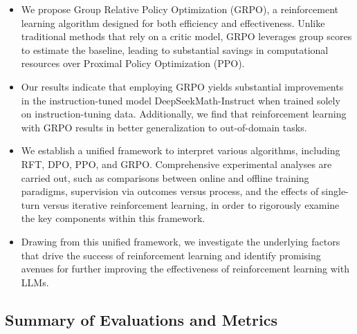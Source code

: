 \begin{itemize}[topsep=0pt]
    \item We propose Group Relative Policy Optimization (GRPO), a reinforcement learning algorithm designed for both efficiency and effectiveness. Unlike traditional methods that rely on a critic model, GRPO leverages group scores to estimate the baseline, leading to substantial savings in computational resources over Proximal Policy Optimization (PPO).
    \item Our results indicate that employing GRPO yields substantial improvements in the instruction-tuned model DeepSeekMath-Instruct when trained solely on instruction-tuning data. Additionally, we find that reinforcement learning with GRPO results in better generalization to out-of-domain tasks.
    \item We establish a unified framework to interpret various algorithms, including RFT, DPO, PPO, and GRPO. Comprehensive experimental analyses are carried out, such as comparisons between online and offline training paradigms, supervision via outcomes versus process, and the effects of single-turn versus iterative reinforcement learning, in order to rigorously examine the key components within this framework.
    \item Drawing from this unified framework, we investigate the underlying factors that drive the success of reinforcement learning and identify promising avenues for further improving the effectiveness of reinforcement learning with LLMs.
\end{itemize}

\subsection{Summary of Evaluations and Metrics}

